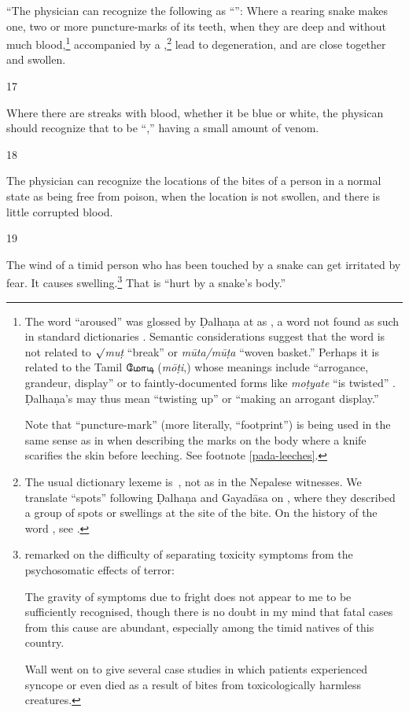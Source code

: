 \begin{translation}
“The physician can recognize the following as “”:
Where a rearing snake  makes one, two or more puncture-marks of its teeth,
when they are deep and without much blood,\footnote{\label{pada-snakes} The
    word  “aroused” was glossed by Ḍalhaṇa at  as
    , a word not found as such in standard dictionaries
    \citep{moni-sans,apte-prac,mayr-kurz,josi-maha}. Semantic considerations
    suggest that the word is not related to $\surd$\emph{muṭ} “break” or
    \emph{mūta/mūṭa} “woven basket.” Perhaps it is related to the Tamil
    \texttamil{மோடி} (\emph{mōṭi},) whose meanings include “arrogance, grandeur,
    display” \citep[\#5133]{burr-1984} or to faintly-documented forms like
    \emph{moṭyate} “is twisted” \citep[\#10186]{CDIAL}. Ḍalhaṇa's 
    may thus mean “twisting up” or “making an arrogant display.” \par Note that
     “puncture-mark” (more literally, “footprint”) is being used in
    the same sense as in  when describing the marks on the body
    where a knife scarifies the skin before leeching. See footnote
    \ref{pada-leeches}.} accompanied by a ,\footnote{The usual dictionary lexeme is \,, not 
        as in the Nepalese witnesses.  We translate “spots” following Ḍalhaṇa and
        Gayadāsa on , where they described a group of spots or
        swellings at the site of the bite. On the history of the word ,
        see \cite{kief-1996}.} lead to degeneration, and are close together and
        swollen.

\item [17]  

Where there are streaks with blood, whether it be blue or white, the
physican should recognize that to be “,” having a small
amount of venom.

\item[18]

The physician can recognize the locations of the bites of a person in a
normal state as being free from poison, when the location is not swollen,
and there is little corrupted blood.

\item [19]

The wind of a timid person who has been touched by a snake can get
irritated by fear.  It causes
swelling.\footnote{\label{fright}\citet[69]{wall-1913} remarked on the difficulty 
of separating
    toxicity symptoms from the psychosomatic effects of terror:\begin{quoting}
        The gravity of symptoms due to fright does not appear to me to be 
        sufficiently recognised, though there is no doubt in my mind that fatal cases 
        from this cause are abundant, especially among the timid natives of this 
        country.\end{quoting} Wall went on to give several case studies in which 
        patients experienced syncope or even died as a result of bites from 
        toxicologically harmless creatures.}  That is “hurt
    by a snake's body.”


\end{translation}
